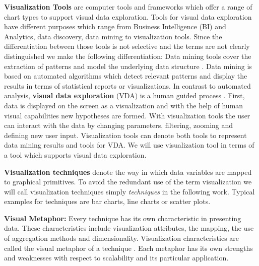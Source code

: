 \par
\textbf{Visualization Tools}\label{tools} are computer tools and frameworks which offer a range of chart types to support visual data exploration. Tools for visual data exploration have different purposes which range from Business Intelligence (\gls{BI}) and Analytics, data discovery, data mining to visualization tools. Since the differentiation between those tools is not selective and the terms are not clearly distinguished we make the following differentiation:
Data mining tools cover the extraction of patterns and model the underlying data structure  \cite{FerreiradeOliveira2003}. Data mining is based on automated algorithms which detect relevant patterns and display the results in terms of statistical reports or visualizations. In contrast to automated analysis, \textbf{visual data exploration} (\gls{VDA}) is a human guided process  \cite{FerreiradeOliveira2003}. First, data is displayed on the screen as a visualization and with the help of human visual capabilities new hypotheses are formed. With visualization tools the user can interact with the data by changing parameters, filtering, zooming and defining new user input. Visualization tools can denote both tools to represent data mining results and tools for \gls{VDA}. We will use visualization tool in terms of a tool which supports visual data exploration. 



\textbf{Visualization techniques} denote the way in which data variables are mapped to graphical primitives. To avoid the redundant use of the term visualization we will call visualization techniques simply \textit{techniques} in the following work. Typical examples for techniques are bar charts, line charts or scatter plots. 
\par
\textbf{Visual Metaphor: } Every technique has its own characteristic in presenting data. These characteristics include visualization attributes, the mapping, the use of aggregation methods and dimensionality. Visualization characteristics are called the visual metaphor of a technique  \cite{Tegarden1999}. Each metaphor has its own strengths and weaknesses with respect to scalability and its particular application. 

